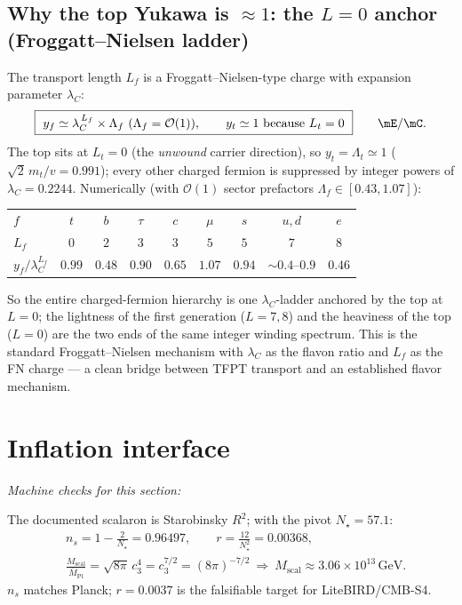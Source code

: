 \documentclass[11pt,a4paper]{article}
\newcommand{\Mbar}{\bar M_{\mathrm{Pl}}}
\newcommand{\cthree}{c_3}
\newcommand{\lC}{\lambda_C}
\theoremstyle{definition}
\begin{document}
\subsection{Why the top Yukawa is $\approx1$: the $L=0$ anchor (Froggatt--Nielsen ladder)}
The transport length $L_f$ is a Froggatt--Nielsen-type charge with expansion parameter $\lC$:
\begin{equation}
  \boxed{\ y_f\simeq\lambda_C^{\,L_f}\times\Lambda_f\ (\Lambda_f=\mathcal O(1)),\qquad y_t\simeq1\ \text{because}\ L_t=0\ }\qquad\mE/\mC .
\end{equation}
The top sits at $L_t=0$ (the \emph{unwound} carrier direction), so $y_t=\Lambda_t\simeq1$
($\sqrt2\,m_t/v=0.991$); every other charged fermion is suppressed by integer powers of
$\lC=0.2244$. Numerically (with $\mathcal O(1)$ sector prefactors $\Lambda_f\in[0.43,1.07]$):
\begin{center}\small
\begin{tabular}{@{}lcccccccc@{}}
\toprule
$f$ & $t$ & $b$ & $\tau$ & $c$ & $\mu$ & $s$ & $u,d$ & $e$ \\
$L_f$ & $0$ & $2$ & $3$ & $3$ & $5$ & $5$ & $7$ & $8$ \\
$y_f/\lambda_C^{L_f}$ & $0.99$ & $0.48$ & $0.90$ & $0.65$ & $1.07$ & $0.94$ & $\sim0.4$--$0.9$ & $0.46$ \\
\bottomrule
\end{tabular}
\end{center}
So the entire charged-fermion hierarchy is one $\lC$-ladder anchored by the top at $L=0$; the lightness
of the first generation ($L=7,8$) and the heaviness of the top ($L=0$) are the two ends of the same
integer winding spectrum. This is the standard Froggatt--Nielsen mechanism with $\lC$ as the flavon
ratio and $L_f$ as the FN charge --- a clean bridge between TFPT transport and an established flavor
mechanism.

\section{Inflation interface}
\noindent\emph{Machine checks for this section:}   


The documented scalaron is Starobinsky $R^2$; with the pivot $N_\star=57.1$:
\begin{equation}
\begin{aligned}
  &n_s=1-\frac{2}{N_\star}=0.96497,\qquad r=\frac{12}{N_\star^2}=0.00368,\\
  &\frac{M_{\mathrm{scal}}}{\Mbar}=\sqrt{8\pi}\,\cthree^4=\cthree^{7/2}=(8\pi)^{-7/2}
  \ \Rightarrow\ M_{\mathrm{scal}}\approx3.06\times10^{13}\,\mathrm{GeV}.
\end{aligned}
\end{equation}
$n_s$ matches Planck; $r=0.0037$ is the falsifiable target for LiteBIRD/CMB-S4.
\end{document}
